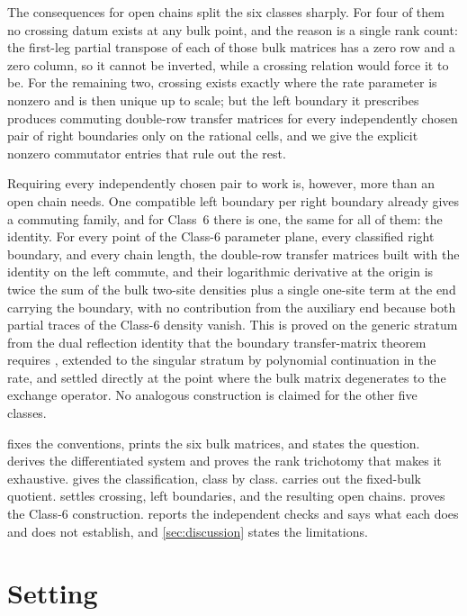\documentclass[11pt,reqno]{amsart}
\theoremstyle{plain}
\theoremstyle{definition}
\theoremstyle{remark}
\numberwithin{equation}{section}
\begin{document}
The consequences for open chains split the six classes sharply. For four of them
no crossing datum exists at any bulk point, and the reason is a single rank
count: the first-leg partial transpose of each of those bulk matrices has a zero
row and a zero column, so it cannot be inverted, while a crossing relation would
force it to be. For the remaining two, crossing exists exactly where the rate
parameter is nonzero and is then unique up to scale; but the left boundary it
prescribes produces commuting double-row transfer matrices for every
independently chosen pair of right boundaries only on the rational cells, and we
give the explicit nonzero commutator entries that rule out the rest.

Requiring every independently chosen pair to work is, however, more than an open
chain needs. One compatible left boundary per right boundary already gives a
commuting family, and for Class~6 there is one, the same for all of them: the
identity. For every point of the Class-6 parameter plane, every classified right
boundary, and every chain length, the double-row transfer matrices built with the
identity on the left commute, and their logarithmic derivative at the origin is
twice the sum of the bulk two-site densities plus a single one-site term at the
end carrying the boundary, with no contribution from the auxiliary end because
both partial traces of the Class-6 density vanish. This is proved on the generic
stratum from the dual reflection identity that the boundary transfer-matrix
theorem requires \cite{Vlaar_2015bt}, extended to the singular stratum by
polynomial continuation in the rate, and settled directly at the point where the
bulk matrix degenerates to the exchange operator. No analogous construction is
claimed for the other five classes.

 fixes the conventions, prints the six bulk matrices, and
states the question.  derives the differentiated system
and proves the rank trichotomy that makes it exhaustive. 
gives the classification, class by class.  carries out the
fixed-bulk quotient.  settles crossing, left boundaries, and
the resulting open chains.  proves the Class-6 construction.
 reports the independent checks and says what each does and does
not establish, and \cref{sec:discussion} states the limitations.

\section{Setting}
\label{sec:setting}
\end{document}
